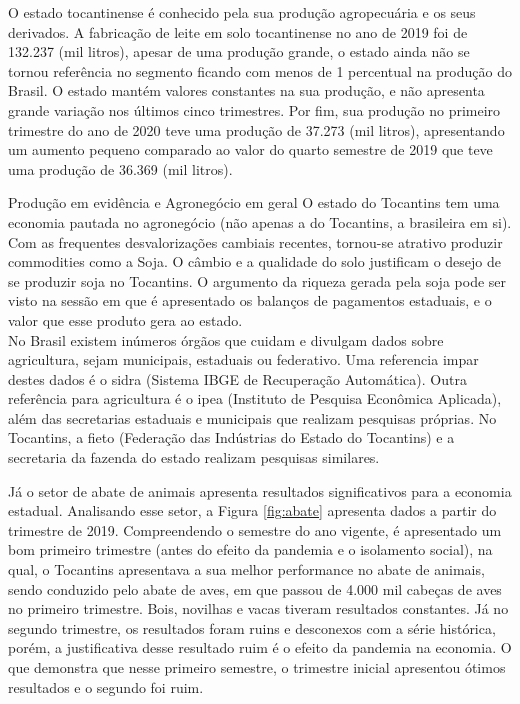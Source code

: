 \par O estado tocantinense é conhecido pela sua produção agropecuária e os seus derivados. A fabricação de leite em solo tocantinense no ano de 2019 foi de 132.237 (mil litros), apesar de uma produção grande, o estado ainda não se tornou referência no segmento ficando com menos de 1 percentual na produção do Brasil. O estado mantém valores constantes na sua produção, e não apresenta grande variação nos últimos cinco trimestres. Por fim, sua produção no primeiro trimestre do ano de 2020 teve uma produção de 37.273 (mil litros), apresentando um aumento pequeno comparado ao valor do quarto semestre de 2019 que teve uma produção de 36.369 (mil litros).
\begin{smbox}[label={labelbox},nameref={Agricultura}]{Produção em evidência e Agronegócio em geral}
	O estado do Tocantins tem uma economia pautada no agronegócio (não apenas a do Tocantins, a brasileira em si). Com as frequentes desvalorizações cambiais recentes, tornou-se atrativo produzir commodities como a Soja. O câmbio e a qualidade do solo justificam o desejo de se produzir soja no Tocantins. O argumento da riqueza gerada pela soja pode ser visto na sessão em que é apresentado os balanços de pagamentos estaduais, e o valor que esse produto gera ao estado.
\\
	No Brasil existem inúmeros órgãos que cuidam e divulgam dados sobre agricultura, sejam municipais, estaduais ou federativo. Uma referencia impar destes dados é o \acrshort{sidra} (Sistema IBGE de Recuperação Automática). Outra referência para agricultura é o \acrshort{ipea} (Instituto de Pesquisa Econômica Aplicada), além das secretarias estaduais e municipais que realizam pesquisas próprias. No Tocantins, a \acrshort{fieto} (Federação das Indústrias do Estado do Tocantins) e a secretaria da fazenda do estado realizam pesquisas similares.
\end{smbox}

\par Já o setor de abate de animais apresenta resultados significativos para a economia estadual. Analisando esse setor, a Figura \ref{fig:abate} apresenta dados a partir do trimestre de 2019. Compreendendo o semestre do ano vigente, é apresentado um bom primeiro trimestre (antes do efeito da pandemia e o isolamento social), na qual, o Tocantins apresentava a sua melhor performance no abate de animais, sendo conduzido pelo abate de aves, em que passou de 4.000 mil cabeças de aves no primeiro trimestre. Bois, novilhas e vacas tiveram resultados constantes. Já no segundo trimestre, os resultados foram ruins e desconexos com a série histórica, porém, a justificativa desse resultado ruim é o efeito da pandemia na economia. O que demonstra que nesse primeiro semestre, o trimestre inicial apresentou ótimos resultados e o segundo foi ruim.


